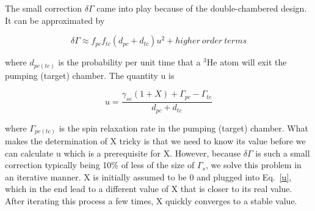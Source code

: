 The small correction $\delta\Gamma$ came into play because of the double-chambered design. It can be approximated by

\begin{equation}
\delta\Gamma\approx f_{pc}f_{tc}(d_{pc}+d_{tc})u^2 + higher~order~terms
\end{equation}

where $d_{pc(tc)}$ is the probability per unit time that a $^3$He atom will exit the pumping (target) chamber. The quantity u is 

\begin{equation}\label{u}
u=\frac{\gamma_{se}(1+X)+\Gamma_{pc}-\Gamma_{tc}}{d_{pc}+d_{tc}}
\end{equation}

where $\Gamma_{pc(tc)}$ is the spin relaxation rate in the pumping (target) chamber. What makes the determination of X tricky is that we need to know its value before we can calculate u which is a prerequisite for X. However, because $\delta\Gamma$ is such a small correction typically being 10\% of less of the size of $\Gamma_s$, we solve this problem in an iterative manner. X is initially assumed to be 0 and plugged into Eq.~\ref{u}, which in the end lead to a different value of X that is closer to its real value. After iterating this process a few times, X quickly converges to a stable value.

